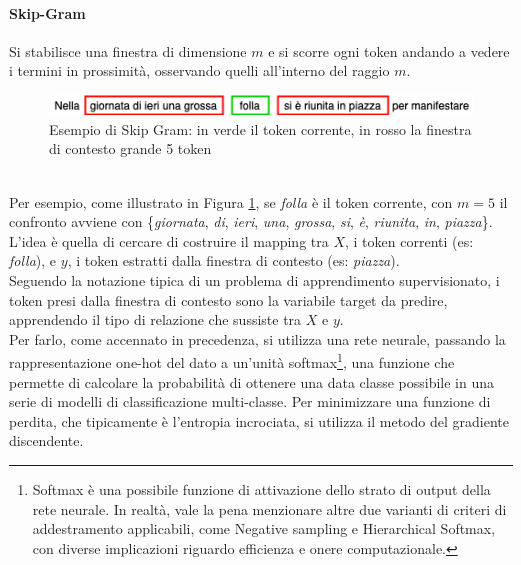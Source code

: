 \documentclass[12pt]{report}
\theoremstyle{definition}
\begin{document}
\paragraph{Skip-Gram}
Si stabilisce una finestra di dimensione $m$ e si scorre ogni token andando a vedere i termini in prossimità, osservando quelli all'interno del raggio $m$.
\\
\begin{figure}
    \centering
    \includegraphics[scale = 0.7]{images/skip-gram.png}
    \caption{Esempio di Skip Gram: in verde il token corrente, in rosso la finestra di contesto grande 5 token}
    \label{skipgram}
\end{figure}
\\
Per esempio, come illustrato in Figura \ref{skipgram}, se \textit{folla} è il token corrente, con $m = 5$ il confronto avviene con \{\textit{giornata}, \textit{di}, \textit{ieri}, \textit{una}, \textit{grossa}, \textit{si}, \textit{è}, \textit{riunita}, \textit{in}, \textit{piazza}\}.
\\
L'idea è quella di cercare di costruire il mapping tra $X$, i token correnti (es: \textit{folla}), e $y$, i token estratti dalla finestra di contesto (es: \textit{piazza}).
\\
Seguendo la notazione tipica di un problema di apprendimento supervisionato, i token presi dalla finestra di contesto sono la variabile target da predire, apprendendo il tipo di relazione che sussiste tra  $X$ e $y$.
\\
Per farlo, come accennato in precedenza, si utilizza una rete neurale, passando la rappresentazione one-hot del dato a un'unità softmax\footnote{Softmax è una possibile funzione di attivazione dello strato di output della rete neurale. In realtà, vale la pena menzionare altre due varianti di criteri di addestramento applicabili, come Negative sampling e Hierarchical Softmax, con diverse implicazioni riguardo efficienza e onere computazionale.}, una funzione che permette di calcolare la probabilità di ottenere una data classe possibile in una serie di modelli di classificazione multi-classe. Per minimizzare una funzione di perdita, che tipicamente è l'entropia incrociata, si utilizza il metodo del gradiente discendente. 
\end{document}
